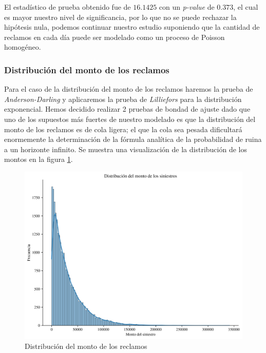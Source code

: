 \documentclass[journal]{IEEEtran}
\begin{document}
                El estadístico de prueba obtenido fue de $16.1425$ con un \textit{p-value} de $0.373$, el cual es mayor nuestro nivel de significancia, por lo que no se puede rechazar la hipótesis nula, podemos continuar nuestro estudio suponiendo que la cantidad de reclamos en cada día puede ser modelado como un proceso de Poisson homogéneo.

            \subsubsection{Distribución del monto de los reclamos}

                Para el caso de la distribución del monto de los reclamos haremos la prueba de \textit{Anderson-Darling}\cite{evans2008distribution} y aplicaremos la prueba de \emph{Lilliefors} \cite{lilliefors1969kolmogorov} para la distribución exponencial. Hemos decidido realizar 2 pruebas de bondad de ajuste dado que uno de los supuestos más fuertes de nuestro modelado es que la distribución del monto de los reclamos es de cola ligera; el que la cola sea pesada dificultará enormemente la determinación de la fórmula analítica de la probabilidad de ruina a un horizonte infinito. Se muestra una visualización de la distribución de los montos en la figura \ref{img:amount-dist}.
                \begin{figure}[!htbp]
                    \centering
                    \includegraphics[scale=0.45]{img/amount_dist.png}
                    \caption{Distribución del monto de los reclamos}
                    \label{img:amount-dist}
                \end{figure}
\end{document}

